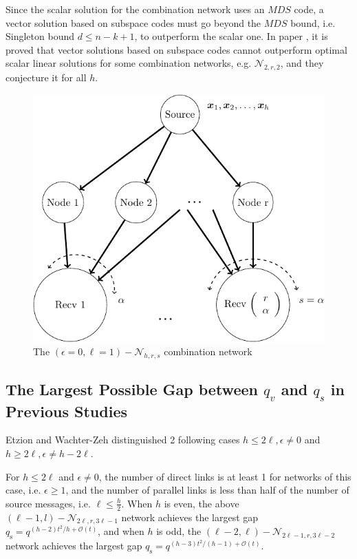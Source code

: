 Since the scalar solution for the combination network uses an $MDS$
code, a vector solution based on subspace codes must go beyond the
$MDS$ bound, i.e. Singleton bound $d\leq n-k+1$, to outperform the
scalar one. In paper \cite[Sec. IV-A, Sec. IX-1,2]{Wachter-Zeh:2018},
it is proved that vector solutions based on subspace codes cannot
outperform optimal scalar linear solutions for some combination networks,
e.g. $\mathcal{N}_{2,r,2}$, and they conjecture it for all $h$.
\begin{figure}[H]
\caption{The $\left(\epsilon=0,\ell=1\right)-\mathcal{N}_{h,r,s}$ combination
network \label{fig:network_special4}}

\centering{}\includegraphics[width=0.4\paperwidth]{./figures/nw_special4_combination}
\end{figure}


\subsection{The Largest Possible Gap between $q_{v}$ and $q_{s}$ in Previous
Studies}

Etzion and Wachter-Zeh distinguished 2 following cases $h\leq2\ell,\epsilon\neq0$
and $h\geq2\ell,\epsilon\neq h-2\ell$.

For $h\leq2\ell$ and $\epsilon\neq0$, the number of direct links
is at least 1 for networks of this case, i.e. $\epsilon\geq1$, and
the number of parallel links is less than half of the number of source
messages, i.e. $\ell\leq\frac{h}{2}$. When $h$ is even, the above
$\left(\ell-1,l\right)-\mathcal{N}_{2\ell,r,3\ell-1}$ network achieves
the largest gap $q_{\mathrm{s}}=q^{(h-2)t^{2}/h+\mathcal{O}(t)}$,
and when $h$ is odd, the $\left(\ell-2,\ell\right)-\mathcal{N}_{2\ell-1,r,3\ell-2}$
network achieves the largest gap $q_{\mathrm{s}}=q^{\left(h-3\right)t^{2}/\left(h-1\right)+\mathcal{O}(t)}$.

